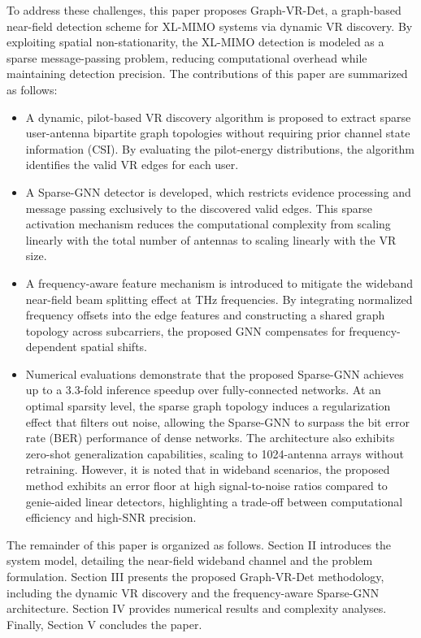 To address these challenges, this paper proposes Graph-VR-Det, a graph-based near-field detection scheme for XL-MIMO systems via dynamic VR discovery. By exploiting spatial non-stationarity, the XL-MIMO detection is modeled as a sparse message-passing problem, reducing computational overhead while maintaining detection precision. The contributions of this paper are summarized as follows:
\begin{itemize}
    \item A dynamic, pilot-based VR discovery algorithm is proposed to extract sparse user-antenna bipartite graph topologies without requiring prior channel state information (CSI). By evaluating the pilot-energy distributions, the algorithm identifies the valid VR edges for each user.
    \item A Sparse-GNN detector is developed, which restricts evidence processing and message passing exclusively to the discovered valid edges. This sparse activation mechanism reduces the computational complexity from scaling linearly with the total number of antennas to scaling linearly with the VR size.
    \item A frequency-aware feature mechanism is introduced to mitigate the wideband near-field beam splitting effect at THz frequencies. By integrating normalized frequency offsets into the edge features and constructing a shared graph topology across subcarriers, the proposed GNN compensates for frequency-dependent spatial shifts.
    \item Numerical evaluations demonstrate that the proposed Sparse-GNN achieves up to a 3.3-fold inference speedup over fully-connected networks. At an optimal sparsity level, the sparse graph topology induces a regularization effect that filters out noise, allowing the Sparse-GNN to surpass the bit error rate (BER) performance of dense networks. The architecture also exhibits zero-shot generalization capabilities, scaling to 1024-antenna arrays without retraining. However, it is noted that in wideband scenarios, the proposed method exhibits an error floor at high signal-to-noise ratios compared to genie-aided linear detectors, highlighting a trade-off between computational efficiency and high-SNR precision.
\end{itemize}

The remainder of this paper is organized as follows. Section II introduces the system model, detailing the near-field wideband channel and the problem formulation. Section III presents the proposed Graph-VR-Det methodology, including the dynamic VR discovery and the frequency-aware Sparse-GNN architecture. Section IV provides numerical results and complexity analyses. Finally, Section V concludes the paper.